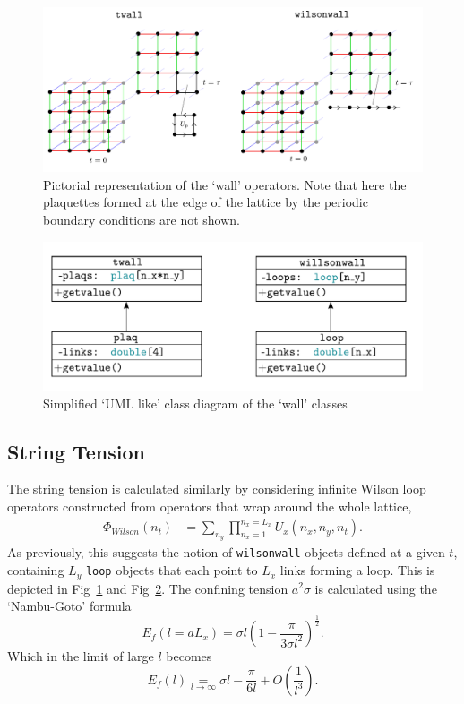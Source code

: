 \documentclass[12pt]{article}
\begin{document}
\begin{figure}
\centering
\includegraphics[width=\linewidth]{wallops.pdf}
\caption{\label{fig:phiops} Pictorial representation of the `wall' operators. Note that here the plaquettes formed at the edge of the lattice by the periodic boundary conditions are not shown.}
\end{figure}

\begin{figure}
\centering
\includegraphics[width=0.8\linewidth]{wallclasses.pdf}
\caption{\label{fig:wallclasses} Simplified `UML like' class diagram of the `wall' classes}
\end{figure}

\subsection{String Tension}
The string tension is calculated similarly by considering infinite Wilson loop operators constructed from operators that wrap around the whole lattice,
\begin{align}
    \Phi_{Wilson}(n_t) &= \sum_{n_y} \prod_{n_x=1}^{n_x=L_x} U_{\hat{x}}(n_x,n_y,n_t).
\end{align}
As previously, this suggests the notion of \texttt{wilsonwall} objects defined at a given $t$, containing $L_y$ \texttt{loop} objects that each point to $L_x$ links forming a loop. This is depicted in Fig~\ref{fig:phiops} and Fig~\ref{fig:wallclasses}. The confining tension $a^2\sigma$ is calculated using the `Nambu-Goto' formula
\begin{equation}
    E_f(l = aL_x) = \sigma l\left( 1 - \frac{\pi}{3\sigma l^2} \right)^{\frac{1}{2}}.
\end{equation}
Which in the limit of large $l$ becomes
\begin{equation}
    E_f(l) \underset{l \rightarrow \infty}{=} \sigma l - \frac{\pi}{6l} + O\left(\frac{1}{l^3}\right).
    \label{eq:ng}
\end{equation}
\end{document}
